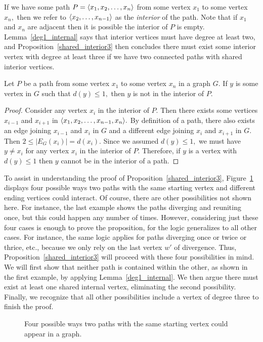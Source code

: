 If we have some path $P = \langle x_1, x_2, \dots, x_n \rangle $ from some vertex $x_1$ to some vertex $x_n,$ then we refer to $\langle x_2, \dots, x_{n-1} \rangle$ as the \textit{interior} of the path. Note that if $x_1$ and $x_n$ are adjacent then it is possible the interior of $P$ is empty. Lemma~\ref{deg1_internal} says that interior vertices must have degree at least two, and Proposition~\ref{shared_interior3} then concludes there must exist some interior vertex with degree at least three if we have two connected paths with shared interior vertices.

\begin{lemma}\label{deg1_internal}
Let $P$ be a path from some vertex $x_1$ to some vertex $x_n$ in a graph $G.$ If $y$ is some vertex in $G$ such that $d(y) \leq 1,$ then $y$ is not in the interior of $P.$
\end{lemma}
\begin{proof}
    Consider any vertex $x_i$ in the interior of $P.$ Then there exists some vertices $x_{i-1}$ and $x_{i+1}$ in $\langle x_1, x_2, \dots, x_{n-1}, x_n \rangle.$ By definition of a path, there also exists an edge joining $x_{i-1}$ and $x_i$ in $G$ and a different edge joining $x_i$ and $x_{i+1}$ in $G.$ Then $2 \leq |E_G(x_i)| = d(x_i).$ Since we assumed $d(y) \leq 1,$ we must have $y \neq x_i$ for any vertex $x_i$ in the interior of $P.$ Therefore, if $y$ is a vertex with $d(y) \leq 1$ then $y$ cannot be in the interior of a path.
\end{proof}

To assist in understanding the proof of Proposition~\ref{shared_interior3}, Figure~\ref{fig:2paths} displays four possible ways two paths with the same starting vertex and different ending vertices could interact. Of course, there are other possibilities not shown here. For instance, the last example shows the paths diverging and reuniting once, but this could happen any number of times. However, considering just these four cases is enough to prove the proposition, for the logic generalizes to all other cases. For instance, the same logic applies for paths diverging once or twice or thrice, etc., because we only rely on the last vertex $w'$ of divergence. Thus, Proposition~\ref{shared_interior3} will proceed with these four possibilities in mind. We will first show that neither path is contained within the other, as shown in the first example, by applying Lemma~\ref{deg1_internal}. We then argue there must exist at least one shared internal vertex, eliminating the second possibility. Finally, we recognize that all other possibilities include a vertex of degree three to finish the proof.
\begin{figure}
    \centering
    
    \caption{Four possible ways two paths with the same starting vertex could appear in a graph.}
    \label{fig:2paths}
\end{figure}

